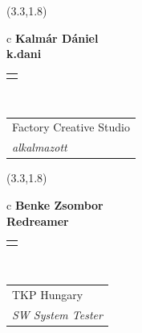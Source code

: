 \documentclass[11pt]{article}
\begin{document}
\makebox(3.3,1.8){
  \renewcommand\arraystretch{1.3}
  \begin{tabular}[c]{c}
    \hspace{8.5mm}
    \LARGE\bf{ Kalmár Dániel }\\
    \hspace{8.5mm}
    \Large{ k.dani }\\
    \renewcommand\arraystretch{3}
    \begin{tabular}[c]{c}
      \centering
      \fontfamily{phv}\selectfont{
        \textbf{
          \textsc{
            \scriptsize{
            \color{Bright}{ Ismerkedő }\color{Bright}{ Webmester }\color{Bright}{ Sminkmester }\color{Dark}{ Programozó }
            }
          }
        }
      }
    \end{tabular}
    \\
    \renewcommand\arraystretch{1}
    \begin{tabular}{p{3.3in}}
      \hspace{.7cm}Factory Creative Studio\\
      \hspace{.7cm}\emph{ alkalmazott }\\
    \end{tabular}
  \end{tabular}
}

\makebox(3.3,1.8){
  \renewcommand\arraystretch{1.3}
  \begin{tabular}[c]{c}
    \hspace{8.5mm}
    \LARGE\bf{ Benke Zsombor }\\
    \hspace{8.5mm}
    \Large{ Redreamer }\\
    \renewcommand\arraystretch{3}
    \begin{tabular}[c]{c}
      \centering
      \fontfamily{phv}\selectfont{
        \textbf{
          \textsc{
            \scriptsize{
            \color{Dark}{ Ismerkedő }\color{Dark}{ Webmester }\color{Bright}{ Sminkmester }\color{Bright}{ Programozó }
            }
          }
        }
      }
    \end{tabular}
    \\
    \renewcommand\arraystretch{1}
    \begin{tabular}{p{3.3in}}
      \hspace{.7cm}TKP Hungary\\
      \hspace{.7cm}\emph{ SW System Tester }\\
    \end{tabular}
  \end{tabular}
}
\end{document}
